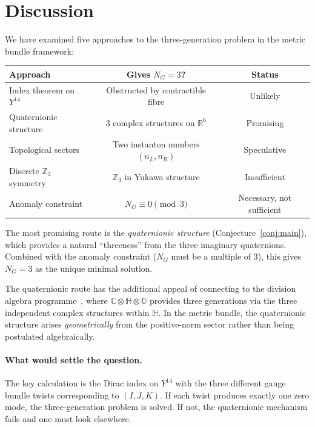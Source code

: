 \documentclass[12pt,a4paper]{article}
\theoremstyle{definition}
\newcommand{\R}{\mathbb{R}}
\newcommand{\C}{\mathbb{C}}
\newcommand{\Z}{\mathbb{Z}}
\newcommand{\HH}{\mathbb{H}}
\begin{document}
\section{Discussion}
\label{sec:discussion}

We have examined five approaches to the three-generation problem in the metric bundle framework:

\begin{center}
\renewcommand{\arraystretch}{1.3}
\begin{tabular}{lcc}
\toprule
\textbf{Approach} & \textbf{Gives $N_G = 3$?} & \textbf{Status} \\
\midrule
Index theorem on $Y^{14}$ & Obstructed by contractible fibre & Unlikely \\
Quaternionic structure & $3$ complex structures on $\R^6$ & Promising \\
Topological sectors & Two instanton numbers $(n_L, n_R)$ & Speculative \\
Discrete $\Z_3$ symmetry & $\Z_3$ in Yukawa structure & Insufficient \\
Anomaly constraint & $N_G \equiv 0 \pmod{3}$ & Necessary, not sufficient \\
\bottomrule
\end{tabular}
\end{center}

The most promising route is the \emph{quaternionic structure} (Conjecture~\ref{conj:main}), which provides a natural ``threeness'' from the three imaginary quaternions.
Combined with the anomaly constraint ($N_G$ must be a multiple of $3$), this gives $N_G = 3$ as the unique minimal solution.

The quaternionic route has the additional appeal of connecting to the division algebra programme~\cite{Furey2016,Dixon1994}, where $\C \otimes \HH \otimes \mathbb{O}$ provides three generations via the three independent complex structures within $\HH$.
In the metric bundle, the quaternionic structure arises \emph{geometrically} from the positive-norm sector rather than being postulated algebraically.

\paragraph{What would settle the question.}
The key calculation is the Dirac index on $Y^{14}$ with the three different gauge bundle twists corresponding to $(I, J, K)$.
If each twist produces exactly one zero mode, the three-generation problem is solved.
If not, the quaternionic mechanism fails and one must look elsewhere.
\end{document}

